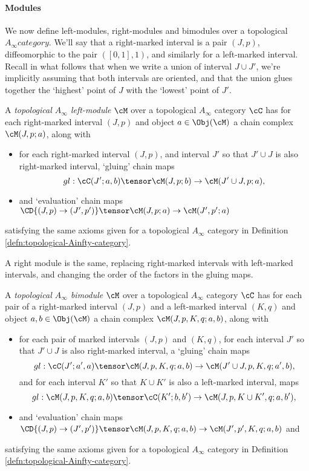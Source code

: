 \paragraph{Modules}
We now define left-modules, right-modules and bimodules over a topological $A_\infty category$. We'll say that a right-marked interval is a pair $(J,p)$, diffeomorphic to the pair $([0,1],1)$, and similarly for a left-marked interval. Recall in what follows that when we write a union of interval $J \cup J'$, we're implicitly assuming that both intervals are oriented, and that the union glues together the `highest' point of $J$ with the `lowest' point of $J'$.

\begin{defn}
\label{defn:topological-Ainfty-module}%
A \emph{topological $A_\infty$ left-module} $\cM$ over a topological $A_\infty$ category $\cC$ has for each right-marked interval $(J,p)$ and object $a \in \Obj(\cM)$ a chain complex $\cM(J,p; a)$, along with
\begin{itemize}
\item for each right-marked interval $(J,p)$, and interval $J'$ so that $J' \cup J$ is also right-marked interval, `gluing' chain maps
$$gl: \cC(J';a,b) \tensor \cM(J,p;b) \to \cM(J' \cup J,p;a),$$
\item and `evaluation' chain maps $\CD{(J,p) \to (J',p')} \tensor \cM(J,p;a) \to \cM(J',p';a)$
\end{itemize}
satisfying the same axioms given for a topological $A_\infty$ category in Definition \ref{defn:topological-Ainfty-category}.
\end{defn}

A right module is the same, replacing right-marked intervals with left-marked intervals, and changing the order of the factors in the gluing maps.

\begin{defn}
\label{defn:topological-Ainfty-bimodule}%
A \emph{topological $A_\infty$ bimodule} $\cM$ over a topological $A_\infty$ category $\cC$ has for each pair of a right-marked interval $(J,p)$ and a left-marked interval $(K,q)$ and object $a,b \in \Obj(\cM)$ a chain complex $\cM(J,p,K,q; a,b)$, along with
\begin{itemize}
\item for each pair of marked intervals $(J,p)$ and $(K,q)$, for each interval $J'$ so that $J' \cup J$ is also right-marked interval, a `gluing' chain maps
$$gl: \cC(J';a',a) \tensor \cM(J,p,K,q;a,b) \to \cM(J' \cup J,p,K,q;a',b),$$
and for each interval $K'$ so that $K \cup K'$ is also a left-marked interval, maps
$$gl: \cM(J,p,K,q;a,b) \tensor \cC(K';b,b') \to \cM(J,p,K \cup K',q;a,b'),$$
\item and `evaluation' chain maps $\CD{(J,p) \to (J',p')} \tensor \cM(J,p,K,q;a,b) \to \cM(J',p',K,q;a,b)$ and 
\end{itemize}
satisfying the same axioms given for a topological $A_\infty$ category in Definition \ref{defn:topological-Ainfty-category}.
\end{defn}


